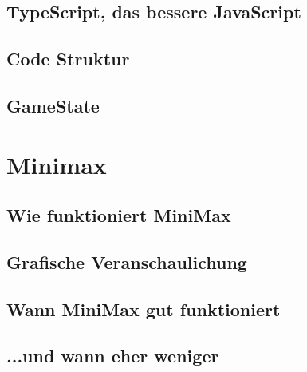 \documentclass[12pt, draft]{beamer}
\begin{document}
\subsection{TypeScript, das bessere JavaScript}
\begin{frame}
	
\end{frame}
\subsection{Code Struktur} \begin{frame}\end{frame}
\subsection{GameState} \begin{frame}\end{frame}

\section{Minimax}
\subsection{Wie funktioniert MiniMax} \begin{frame}\end{frame}
\subsection{Grafische Veranschaulichung} \begin{frame}\end{frame}
\subsection{Wann MiniMax gut funktioniert} \begin{frame}\end{frame}
\subsection{...und wann eher weniger} \begin{frame}\end{frame}
\end{document}
